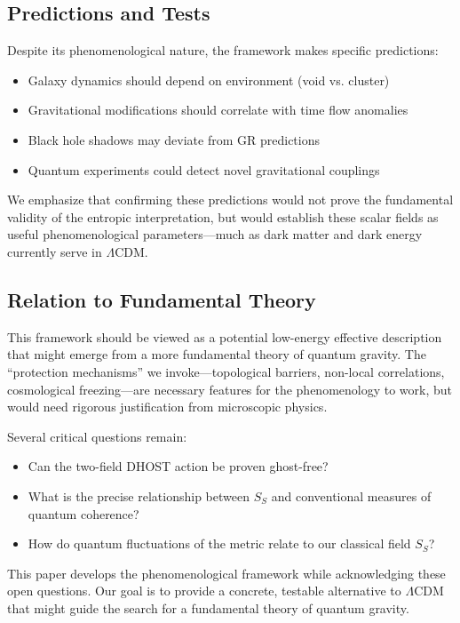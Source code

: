 \documentclass[12pt]{article}
\begin{document}
\subsection{Predictions and Tests}

Despite its phenomenological nature, the framework makes specific predictions:
\begin{itemize}
    \item Galaxy dynamics should depend on environment (void vs. cluster)
    \item Gravitational modifications should correlate with time flow anomalies
    \item Black hole shadows may deviate from GR predictions
    \item Quantum experiments could detect novel gravitational couplings
\end{itemize}
We emphasize that confirming these predictions would not prove the fundamental validity of the entropic interpretation, but would establish these scalar fields as useful phenomenological parameters---much as dark matter and dark energy currently serve in $\Lambda$CDM.

\subsection{Relation to Fundamental Theory}

This framework should be viewed as a potential low-energy effective description that might emerge from a more fundamental theory of quantum gravity. The ``protection mechanisms'' we invoke---topological barriers, non-local correlations, cosmological freezing---are necessary features for the phenomenology to work, but would need rigorous justification from microscopic physics.

Several critical questions remain:
\begin{itemize}
    \item Can the two-field DHOST action be proven ghost-free?
    \item What is the precise relationship between $S_S$ and conventional measures of quantum coherence?
    \item How do quantum fluctuations of the metric relate to our classical field $S_S$?
\end{itemize}
This paper develops the phenomenological framework while acknowledging these open questions. Our goal is to provide a concrete, testable alternative to $\Lambda$CDM that might guide the search for a fundamental theory of quantum gravity.
\end{document}
